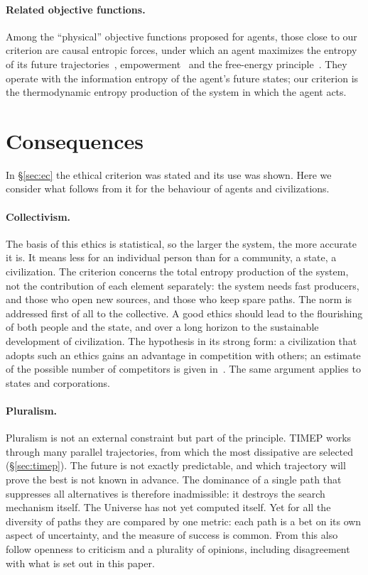 \documentclass[11pt,a4paper]{article}
\newcommand{\Sref}[1]{\hyperref[#1]{\S\ref{#1}}}
\begin{document}
\paragraph{Related objective functions.}
Among the ``physical'' objective functions proposed for agents, those close to our criterion are causal entropic forces, under which an agent maximizes the entropy of its future trajectories~\cite{wissnergross2013}, empowerment~\cite{klyubin2005} and the free-energy principle~\cite{friston2010}. They operate with the information entropy of the agent's future states; our criterion is the thermodynamic entropy production of the system in which the agent acts.

\section{Consequences}\label{sec:consequences}

In \Sref{sec:ec} the ethical criterion was stated and its use was shown. Here we consider what follows from it for the behaviour of agents and civilizations.

\paragraph{Collectivism.}
The basis of this ethics is statistical, so the larger the system, the more accurate it is. It means less for an individual person than for a community, a state, a civilization. The criterion concerns the total entropy production of the system, not the contribution of each element separately: the system needs fast producers, and those who open new sources, and those who keep spare paths. The norm is addressed first of all to the collective. A good ethics should lead to the flourishing of both people and the state, and over a long horizon to the sustainable development of civilization. The hypothesis in its strong form: a civilization that adopts such an ethics gains an advantage in competition with others; an estimate of the possible number of competitors is given in~\cite{ponfilenok2026critical}. The same argument applies to states and corporations.

\paragraph{Pluralism.}
Pluralism is not an external constraint but part of the principle. TIMEP works through many parallel trajectories, from which the most dissipative are selected (\Sref{sec:timep}). The future is not exactly predictable, and which trajectory will prove the best is not known in advance. The dominance of a single path that suppresses all alternatives is therefore inadmissible: it destroys the search mechanism itself. The Universe has not yet computed itself. Yet for all the diversity of paths they are compared by one metric: each path is a bet on its own aspect of uncertainty, and the measure of success is common. From this also follow openness to criticism and a plurality of opinions, including disagreement with what is set out in this paper.
\end{document}
